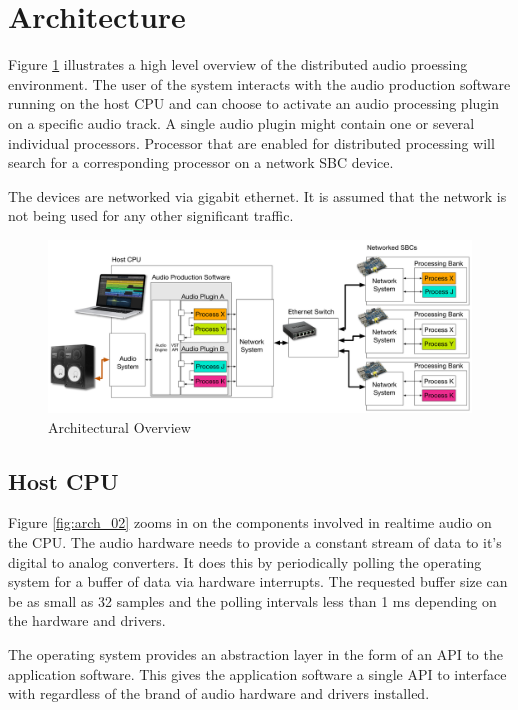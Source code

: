 \section{Architecture}

Figure \ref{fig:arch_01} illustrates a high level overview of the distributed audio proessing environment. The user of the system interacts with the audio production software running on the host CPU and can choose to activate an audio processing plugin on a specific audio track. A single audio plugin might contain one or several individual processors. Processor that are enabled for distributed processing will search for a corresponding processor on a network SBC device.

The devices are networked via gigabit ethernet. It is assumed that the network is not being used for any other significant traffic.

\begin{figure}[H]
    \centering
    \includegraphics[width=\textwidth]{assets/architecture_01.pdf}
    \caption{Architectural Overview}
    \label{fig:arch_01}
\end{figure}

\subsection{Host CPU}

Figure \ref{fig:arch_02} zooms in on the components involved in realtime audio on the CPU. The audio hardware needs to provide a constant stream of data to it's digital to analog converters. It does this by periodically polling the operating system for a buffer of data via hardware interrupts. The requested buffer size can be as small as 32 samples and the polling intervals less than 1 ms depending on the hardware and drivers.

The operating system provides an abstraction layer in the form of an API to the application software. This gives the application software a single API to interface with regardless of the brand of audio hardware and drivers installed.


